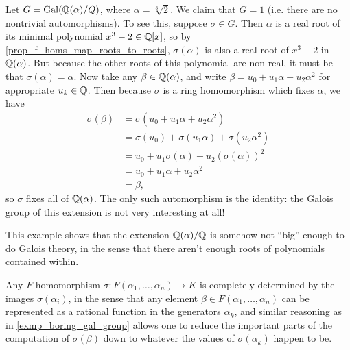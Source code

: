 \begin{example}
\label{exmp_boring_gal_group}
    Let $G = \operatorname{Gal}(\mathbb{{Q}}(\alpha)/Q)$, where $\alpha = \sqrt[3]{2}$. We claim that $G = 1$ (i.e. there are no nontrivial automorphisms). To see this, suppose $\sigma \in G$. Then $\alpha$ is a real root of its minimal polynomial $x^3 - 2 \in \mathbb{{Q}}[x]$, so by \cref{prop_f_homs_map_roots_to_roots}, $\sigma(\alpha)$ is also a real root of $x^3 - 2$ in $\mathbb{{Q}}(\alpha)$. But because the other roots of this polynomial are non-real, it must be that $\sigma(\alpha) = \alpha$. Now take any $\beta \in \mathbb{{Q}}(\alpha)$, and write $\beta = u_0 + u_1 \alpha + u_2 \alpha^2$ for appropriate $u_k \in \mathbb{{Q}}$. Then because $\sigma$ is a ring homomorphism which fixes $\alpha$, we have
    \begin{align*}
        \sigma(\beta)
        &= \sigma(u_0 + u_1 \alpha + u_2 \alpha^2) \\
        &= \sigma(u_0) + \sigma(u_1 \alpha) + \sigma(u_2 \alpha^2) \\
        &= u_0 + u_1 \sigma(\alpha) + u_2 (\sigma(\alpha))^2 \\
        &= u_0 + u_1 \alpha + u_2 \alpha^2 \\
        &= \beta,
    \end{align*}
    so $\sigma$ fixes all of $\mathbb{{Q}}(\alpha)$. The only such automorphism is the identity: the Galois group of this extension is not very interesting at all!
\end{example}

\begin{example}
    This example shows that the extension $\mathbb{{Q}}(\alpha)/\mathbb{{Q}}$ is somehow not ``big'' enough to do Galois theory, in the sense that there aren't enough roots of polynomials contained within.
\end{example}

\begin{remark}
    Any $F$-homomorphism $\sigma: F(\alpha_1, \ldots, \alpha_n) \to K$ is completely determined by the images $\sigma(\alpha_i)$, in the sense that any element $\beta \in F(\alpha_1, \ldots, \alpha_n)$ can be represented as a rational function in the generators $\alpha_k$, and similar reasoning as in \cref{exmp_boring_gal_group} allows one to reduce the important parts of the computation of $\sigma(\beta)$ down to whatever the values of $\sigma(\alpha_k)$ happen to be.
\end{remark}
